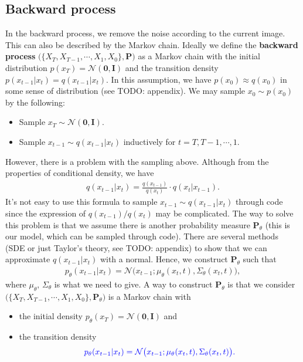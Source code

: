 \documentclass[
]{article}
\providecommand{\tightlist}{%
  \setlength{\itemsep}{0pt}\setlength{\parskip}{0pt}}\usepackage{longtable,booktabs,array}
\theoremstyle{remark}
\begin{document}
\subsection{Backward process}\label{backward-process}

In the backward process, we remove the noise according to the current
image. This can also be described by the Markov chain. Ideally we define
the \textbf{backward process}
\(\bigl( \lbrace X_T,X_{T-1},\cdots,X_1,X_0 \rbrace, \mathbf{P} \bigr)\)
as a Markov chain with the initial distribution
\(p(x_T) = \mathcal{N}(\mathbf{0},\mathbf{I})\) and the transition
density \(p(x_{t-1}\vert x_t)=q(x_{t-1}\vert x_t).\) In this assumption,
we have \(p(x_0)\approx q(x_0)\) in some sense of distribution (see
TODO: appendix). We may sample \(x_0\sim p(x_0)\) by the following:

\begin{itemize}
\tightlist
\item
  Sample \(x_T\sim \mathcal{N}(\mathbf{0},\mathbf{I}).\)
\item
  Sample \(x_{t-1}\sim q(x_{t-1}\vert x_t)\) inductively for
  \(t=T,T-1,\cdots,1.\)
\end{itemize}

However, there is a problem with the sampling above. Although from the
properties of conditional density, we have \[
\begin{aligned}
  q(x_{t-1}\vert x_t) = \frac{q(x_{t-1})}{q(x_t)} \cdot q(x_t\vert x_{t-1}).
\end{aligned}
\] It's not easy to use this formula to sample
\(x_{t-1}\sim q(x_{t-1}\vert x_t)\) through code since the expression of
\(q(x_{t-1})/q(x_t)\) may be complicated. The way to solve this problem
is that we assume there is another probability measure
\(\mathbf{P}_{\theta}\) (this is our model, which can be sampled through
code). There are several methods (SDE or just Taylor's theory, see TODO:
appendix) to show that we can approximate \(q(x_{t-1}\vert x_t)\) with a
normal. Hence, we construct \(\mathbf{P}_{\theta}\) such that \[
\begin{aligned}
  p_{\theta}(x_{t-1}\vert x_t) = \mathcal{N}\bigl(x_{t-1}; \mu_{\theta}(x_t,t),\Sigma_{\theta}(x_t,t)\bigr),
\end{aligned}
\] where \(\mu_{\theta},\, \Sigma_{\theta}\) is what we need to give. A
way to construct \(\mathbf{P}_{\theta}\) is that we consider
\(\bigl( \lbrace X_T,X_{T-1},\cdots, X_1,X_0\rbrace,\mathbf{P}_{\theta} \bigr)\)
is a Markov chain with

\begin{itemize}
\tightlist
\item
  the initial density
  \(p_{\theta}(x_T) = \mathcal{N}(\mathbf{0},\mathbf{I})\) and
\item
  the transition density \[
  \begin{aligned}
    \color{blue}{p_{\theta}(x_{t-1}\vert x_t) = \mathcal{N}\bigl(x_{t-1}; \mu_{\theta}(x_t,t),\Sigma_{\theta}(x_t,t)\bigr).}
  \end{aligned}
  \]
\end{itemize}
\end{document}
